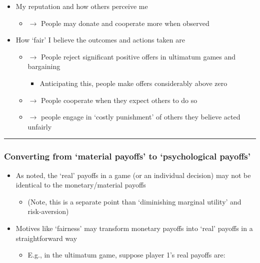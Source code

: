 \documentclass[]{article}
\providecommand{\tightlist}{%
  \setlength{\itemsep}{0pt}\setlength{\parskip}{0pt}}
\begin{document}
\begin{itemize}
\tightlist
\item
  My reputation and how others perceive me

  \begin{itemize}
  \tightlist
  \item
    \(\rightarrow\) People may donate and cooperate more when observed
  \end{itemize}
\item
  How `fair' I believe the outcomes and actions taken are

  \begin{itemize}
  \tightlist
  \item
    \(\rightarrow\) People reject significant positive offers in
    ultimatum games and bargaining

    \begin{itemize}
    \tightlist
    \item
      Anticipating this, people make offers considerably above zero
    \end{itemize}
  \item
    \(\rightarrow\) People cooperate when they expect others to do so
  \item
    \(\rightarrow\) people engage in `costly punishment' of others they
    believe acted unfairly
  \end{itemize}
\end{itemize}

\begin{center}\rule{0.5\linewidth}{\linethickness}\end{center}

\hypertarget{converting-from-material-payoffs-to-psychological-payoffs}{%
\subsubsection{Converting from `material payoffs' to `psychological
payoffs'}\label{converting-from-material-payoffs-to-psychological-payoffs}}

\begin{itemize}
\tightlist
\item
  As noted, the `real' payoffs in a game (or an individual decision) may
  not be identical to the monetary/material payoffs

  \begin{itemize}
  \tightlist
  \item
    (Note, this is a separate point than `diminishing marginal utility'
    and risk-aversion)
  \end{itemize}
\item
  Motives like `fairness' may transform monetary payoffs into `real'
  payoffs in a straightforward way

  \begin{itemize}
  \tightlist
  \item
    E.g., in the ultimatum game, suppose player 1's real payoffs are:
  \end{itemize}
\end{itemize}
\end{document}
